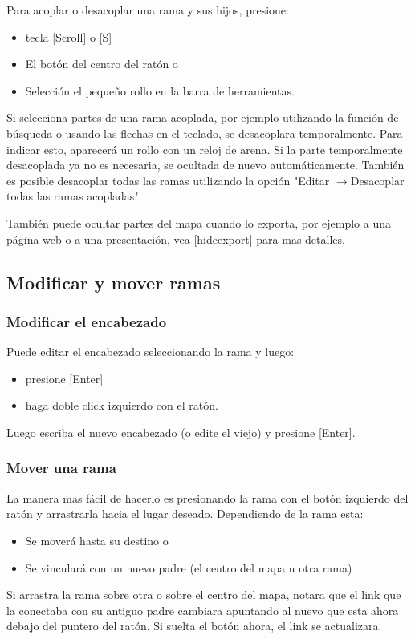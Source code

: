 \documentclass{article}
\newcommand{\ra}{$\longrightarrow$}
\newcommand{\key}[1]{[#1]}
\begin{document}
Para acoplar o desacoplar una rama y sus hijos, presione:
\begin{itemize}
	\item tecla \key{Scroll} o \key{S}
	\item El bot\'on del centro del rat\'on o
	\item Selecci\'on el peque\~no rollo en la barra de herramientas.
\end{itemize}
Si selecciona partes de una rama acoplada, por ejemplo utilizando la funci\'on de b\'usqueda o usando las flechas en el teclado, se desacoplara temporalmente. Para indicar esto, aparecer\'a un rollo con un reloj de arena. Si la parte temporalmente desacoplada ya no es necesaria, se ocultada de nuevo autom\'aticamente. Tambi\'en es posible desacoplar todas las ramas utilizando la opci\'on "Editar \ra Desacoplar todas las ramas acopladas". 

Tambi\'en puede ocultar partes del mapa cuando lo exporta, por ejemplo a una p\'agina web o a una presentaci\'on, vea \ref{hideexport} para mas detalles.



\subsection{Modificar y mover ramas}
\subsubsection*{Modificar el encabezado}
Puede editar el encabezado seleccionando la rama y luego:
\begin{itemize}
	\item presione \key{Enter}
	\item haga doble click izquierdo con el rat\'on.
\end{itemize}
Luego escriba el nuevo encabezado (o edite el viejo) y presione \key{Enter}.

\subsubsection*{Mover una rama}
La manera mas f\'acil de hacerlo es presionando la rama con el bot\'on izquierdo del rat\'on y arrastrarla hacia el lugar deseado. Dependiendo de la rama esta:
\begin{itemize}
	\item Se mover\'a hasta su destino o
	\item Se vincular\'a con un nuevo padre (el centro del mapa u otra rama)
\end{itemize}
Si arrastra la rama sobre otra o sobre el centro del mapa, notara que el link que la conectaba con su antiguo padre cambiara apuntando al nuevo que esta ahora debajo del puntero del rat\'on. Si suelta el bot\'on ahora, el link se actualizara.
\end{document}
